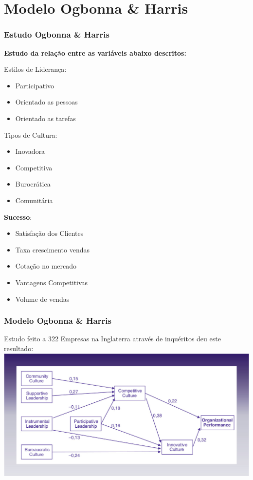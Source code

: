 \section{Modelo Ogbonna \& Harris}
\begin{frame}
\frametitle{Estudo Ogbonna \& Harris}
{\bf Estudo da relação entre as variáveis abaixo descritos:} \\
\vspace{.7cm}
\begin{minipage}[t]{.3\linewidth}
\quad Estilos de Liderança:
\begin{itemize}
\setlength\itemsep{-0.3em}
\item Participativo
\item Orientado as pessoas
\item Orientado as tarefas
\end{itemize}
\end{minipage}
\begin{minipage}[t]{.3\linewidth}
\quad Tipos de Cultura:
\begin{itemize}
\setlength\itemsep{-0.3em}
\item Inovadora
\item Competitiva
\item Burocrática
\item Comunitária
\end{itemize}
\end{minipage}
\begin{minipage}[t]{.3\linewidth}
\quad \textbf{Sucesso}:
\begin{itemize}
\setlength\itemsep{-0.3em}
\item Satisfação dos Clientes
\item Taxa crescimento vendas
\item Cotação no mercado
\item Vantagens Competitivas
\item Volume de vendas
\end{itemize}
\end{minipage}
\end{frame}
\begin{frame}
\frametitle{Modelo Ogbonna \& Harris}
Estudo feito a 322 Empresas na Inglaterra através de inquéritos deu este resultado:\\
\vspace{.2cm}
\includegraphics[scale=.25]{"./image/OB/Ogbonna & Harris.jpg"}
\end{frame}
